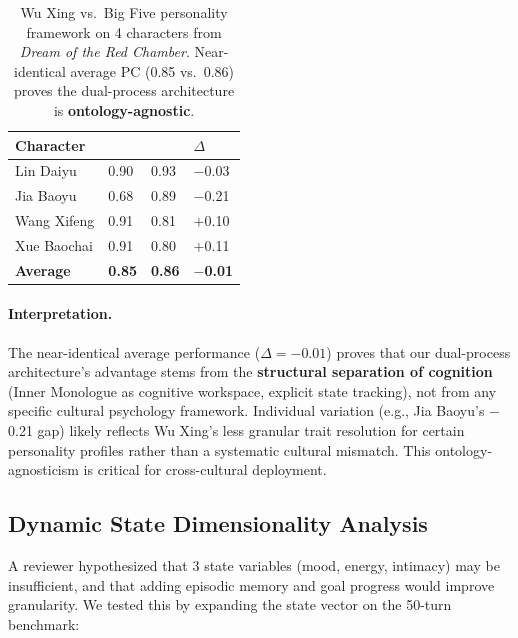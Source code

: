 \documentclass[11pt]{article}
\begin{document}
\begin{CJK*}{UTF8}{gbsn}
\begin{table}[h]
\centering
\small
\setlength{\tabcolsep}{4pt}
\renewcommand{\arraystretch}{1.12}
\begin{tabular}{L{0.34\columnwidth}C{0.18\columnwidth}C{0.20\columnwidth}C{0.10\columnwidth}}
\toprule
\textbf{Character} & \textbf{} & \textbf{} & \textbf{$\Delta$} \\
\midrule
Lin Daiyu & 0.90 & 0.93 & $-$0.03 \\
Jia Baoyu & 0.68 & 0.89 & $-$0.21 \\
Wang Xifeng & 0.91 & 0.81 & $+$0.10 \\
Xue Baochai & 0.91 & 0.80 & $+$0.11 \\
\midrule
\textbf{Average} & \textbf{0.85} & \textbf{0.86} & \textbf{$-$0.01} \\
\bottomrule
\end{tabular}
\caption{Wu Xing vs.\ Big Five personality framework on 4 characters from \textit{Dream of the Red Chamber}. Near-identical average PC (0.85 vs.\ 0.86) proves the dual-process architecture is \textbf{ontology-agnostic}.}
\label{tab:wuxing}
\end{table}

\paragraph{Interpretation.} The near-identical average performance ($\Delta = -0.01$) proves that our dual-process architecture's advantage stems from the \textbf{structural separation of cognition} (Inner Monologue as cognitive workspace, explicit state tracking), not from any specific cultural psychology framework. Individual variation (e.g., Jia Baoyu's $-$0.21 gap) likely reflects Wu Xing's less granular trait resolution for certain personality profiles rather than a systematic cultural mismatch. This ontology-agnosticism is critical for cross-cultural deployment.

\subsection{Dynamic State Dimensionality Analysis}
\label{sec:extended_state}

A reviewer hypothesized that 3 state variables (mood, energy, intimacy) may be insufficient, and that adding episodic memory and goal progress would improve granularity. We tested this by expanding the state vector on the 50-turn benchmark:


\end{CJK*}
\end{document}

